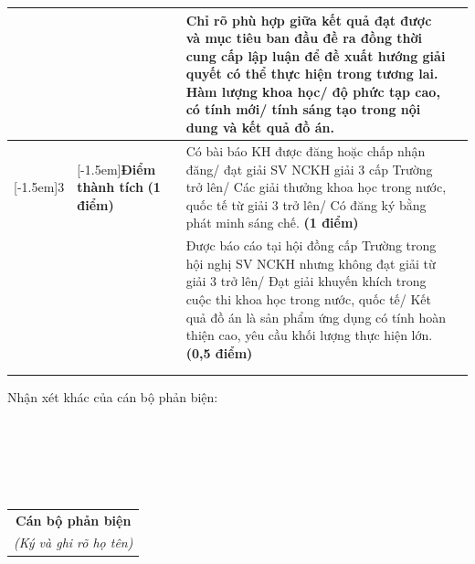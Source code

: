 \begin{center}
\begin{tabular}{|>{\centering\arraybackslash}p{0.8cm}|>{\centering\arraybackslash}p{2.3cm}|>{\raggedright\arraybackslash}p{10.4cm}|>{\centering\arraybackslash}p{1.3cm}|}
  & & Chỉ rõ phù hợp giữa kết quả đạt được và mục tiêu ban đầu đề ra đồng thời cung cấp lập luận để đề xuất hướng giải quyết có thể thực hiện trong tương lai. Hàm lượng khoa học/ độ phức tạp cao, có tính mới/ tính sáng tạo trong nội dung và kết quả đồ án. & \\ \hline
\multirow{2}{*}[-1.5em]{3} & \multirow{2}{\dimexpr 2.3cm - 2\tabcolsep \relax}[-1.5em]{\centering \textbf{Điểm thành tích} \newline \textbf{(1 điểm)}} & Có bài báo KH được đăng hoặc chấp nhận đăng/ đạt giải SV NCKH giải 3 cấp Trường trở lên/ Các giải thưởng khoa học trong nước, quốc tế từ giải 3 trở lên/ Có đăng ký bằng phát minh sáng chế. \textbf{(1 điểm)} & \\ \cline{3-4}
  & & Được báo cáo tại hội đồng cấp Trường trong hội nghị SV NCKH nhưng không đạt giải từ giải 3 trở lên/ Đạt giải khuyến khích trong cuộc thi khoa học trong nước, quốc tế/ Kết quả đồ án là sản phẩm ứng dụng có tính hoàn thiện cao, yêu cầu khối lượng thực hiện lớn. \textbf{(0,5 điểm)} & \\ \hline
\multicolumn{3}{|r|}{\textbf{Điểm tổng các tiêu chí:}} & \\ \hline
\multicolumn{3}{|r|}{\textbf{Điểm phản biện:}} & \\ \hline
\end{tabular}
\end{center}

\newpage
\thispagestyle{empty}
\noindent Nhận xét khác của cán bộ phản biện:\\
\noindent\makebox[\textwidth]{\dotfill}\\
\noindent\makebox[\textwidth]{\dotfill}\\
\noindent\makebox[\textwidth]{\dotfill}\\
\noindent\makebox[\textwidth]{\dotfill}\\
\noindent\makebox[\textwidth]{\dotfill}\\
\noindent\makebox[\textwidth]{\dotfill}

\vspace{40pt}
\hfill
\begin{tabular}{c}
\textbf{Cán bộ phản biện} \\
\textit{(Ký và ghi rõ họ tên)}
\end{tabular}
\newpage
